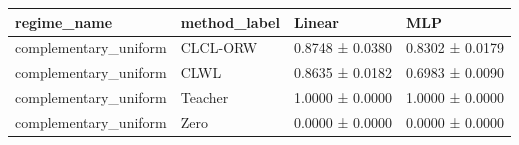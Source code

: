 \begin{tabular}{llll}
\toprule
regime_name & method_label & Linear & MLP \\
\midrule
complementary_uniform & CLCL-ORW & 0.8748 ± 0.0380 & 0.8302 ± 0.0179 \\
complementary_uniform & CLWL & 0.8635 ± 0.0182 & 0.6983 ± 0.0090 \\
complementary_uniform & Teacher & 1.0000 ± 0.0000 & 1.0000 ± 0.0000 \\
complementary_uniform & Zero & 0.0000 ± 0.0000 & 0.0000 ± 0.0000 \\
\bottomrule
\end{tabular}


